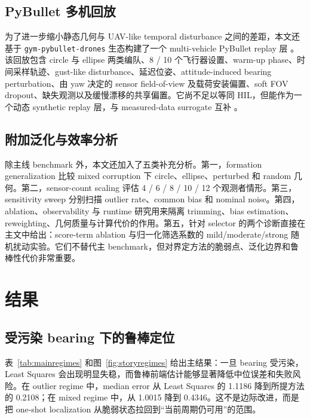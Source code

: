 \documentclass[drones,article,submit,moreauthors]{Definitions/mdpi}
\begin{document}
\subsection{PyBullet 多机回放}

为了进一步缩小静态几何与 UAV-like temporal disturbance 之间的差距，本文还基于 \texttt{gym-pybullet-drones} 生态构建了一个 multi-vehicle PyBullet replay 层 \cite{panerati2021learning}。该回放包含 circle 与 ellipse 两类编队、8 / 10 个飞行器设置、warm-up phase、时间采样轨迹、gust-like disturbance、延迟位姿、attitude-induced bearing perturbation、由 yaw 决定的 sensor field-of-view 及载荷安装偏置、soft FOV dropout、缺失观测以及缓慢漂移的共享偏置。它尚不足以等同 HIL，但能作为一个动态 synthetic replay 层，与 measured-data surrogate 互补 \cite{perezsegui2023bridging}。

\subsection{附加泛化与效率分析}

除主线 benchmark 外，本文还加入了五类补充分析。第一，formation generalization 比较 mixed corruption 下 circle、ellipse、perturbed 和 random 几何。第二，sensor-count scaling 评估 4 / 6 / 8 / 10 / 12 个观测者情形。第三，sensitivity sweep 分别扫描 outlier rate、common bias 和 nominal noise。第四，ablation、observability 与 runtime 研究用来隔离 trimming、bias estimation、reweighting、几何质量与计算代价的作用。第五，针对 selector 的两个诊断直接在主文中给出：score-term ablation 与归一化筛选系数的 mild/moderate/strong 随机扰动实验。它们不替代主 benchmark，但对界定方法的脆弱点、泛化边界和鲁棒性代价非常重要。

\section{结果}

\subsection{受污染 bearing 下的鲁棒定位}

表~\ref{tab:mainregimes} 和图~\ref{fig:storyregimes} 给出主结果：一旦 bearing 受污染，Least Squares 会出现明显失稳，而鲁棒前端估计能够显著降低中位误差和失败风险。在 outlier regime 中，median error 从 Least Squares 的 1.1186 降到所提方法的 0.2108；在 mixed regime 中，从 1.0015 降到 0.4346。这不是边际改进，而是把 one-shot localization 从脆弱状态拉回到“当前周期仍可用”的范围。


\end{document}
